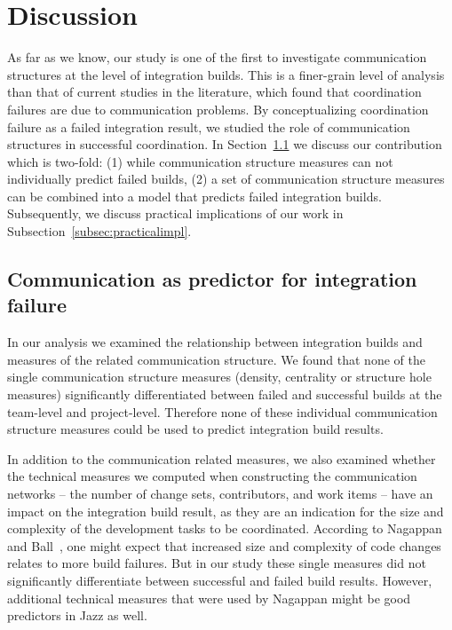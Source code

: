 \section{Discussion}
\label{sec:discussion}
As far as we know, our study is one of the first to investigate communication
structures at the level of integration builds. This is a finer-grain level of
analysis than that of current studies in the literature, which found that
coordination failures are due to communication problems. By conceptualizing
coordination failure as a failed integration result, we studied the role of
communication structures in successful coordination. In
Section~\ref{subsec:commaspred} we discuss our contribution which is two-fold:
(1) while communication structure measures can not individually predict failed
builds, (2) a set of communication structure measures can be combined into a
model that predicts failed integration builds. Subsequently, we discuss practical
implications of our work in Subsection~\ref{subsec:practicalimpl}.

\subsection{Communication as predictor for integration failure}
\label{subsec:commaspred}
In our analysis we examined the relationship between integration builds and
measures of the related communication structure. We found that none of the single
communication structure measures (density, centrality or structure hole measures)
significantly differentiated between failed and successful builds at the
team-level and project-level. Therefore none of these individual communication
structure measures could be used to predict integration build results.

In addition to the communication related measures, we also examined whether the
technical measures we computed when constructing the communication networks --
the number of change sets, contributors, and work items -- have an impact on the
integration build result, as they are an indication for the size and complexity
of the development tasks to be coordinated. According to Nagappan and
Ball~\cite{nagappan:icse:2005}, one might expect that increased size and complexity
of code changes relates to more build failures. But in our study these single
measures did not significantly differentiate between successful and failed build
results. However, additional technical measures that were used by Nagappan might
be good predictors in Jazz as well.

